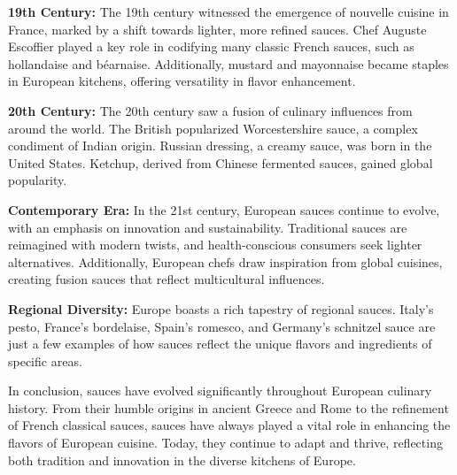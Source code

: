 \textbf{19th Century:} The 19th century witnessed the emergence of nouvelle cuisine in France, marked by a shift towards lighter, more refined sauces. Chef Auguste Escoffier played a key role in codifying many classic French sauces, such as hollandaise and béarnaise. Additionally, mustard and mayonnaise became staples in European kitchens, offering versatility in flavor enhancement.

\textbf{20th Century:} The 20th century saw a fusion of culinary influences from around the world. The British popularized Worcestershire sauce, a complex condiment of Indian origin. Russian dressing, a creamy sauce, was born in the United States. Ketchup, derived from Chinese fermented sauces, gained global popularity.

\textbf{Contemporary Era:} In the 21st century, European sauces continue to evolve, with an emphasis on innovation and sustainability. Traditional sauces are reimagined with modern twists, and health-conscious consumers seek lighter alternatives. Additionally, European chefs draw inspiration from global cuisines, creating fusion sauces that reflect multicultural influences.

\textbf{Regional Diversity:} Europe boasts a rich tapestry of regional sauces. Italy's pesto, France's bordelaise, Spain's romesco, and Germany's schnitzel sauce are just a few examples of how sauces reflect the unique flavors and ingredients of specific areas.

In conclusion, sauces have evolved significantly throughout European culinary history. From their humble origins in ancient Greece and Rome to the refinement of French classical sauces, sauces have always played a vital role in enhancing the flavors of European cuisine. Today, they continue to adapt and thrive, reflecting both tradition and innovation in the diverse kitchens of Europe.
\clearpage

